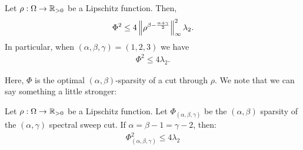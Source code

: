 \begin{theorem}
\label{thm:cheeger_n}
Let $\rho:{\Omega}\to\mathbb{R}_{>0}$ be a Lipschitz function. Then,
\begin{align*}
\Phi^2 \leq 4 \left\lVert \rho^{\beta - \frac{\alpha+\gamma}{2}} \right\rVert^2_\infty \lambda_2.
\end{align*}
In particular, when $(\alpha,\beta,\gamma) = (1,2,3)$ we have
\begin{align*}
\Phi^{2} \leq 4\lambda_2.
\end{align*}
\end{theorem}
Here, $\Phi$ is the optimal $(\alpha,\beta)$-sparsity of a cut
through $\rho$. We note that we can say something a little stronger:
\begin{theorem}
\label{thm:cheeger-sweep}
Let $\rho:{\Omega}\to\mathbb{R}_{>0}$ be a Lipschitz function. 
Let $\Phi_{(\alpha,\beta,\gamma)}$ be the $(\alpha,\beta)$
sparsity of the $(\alpha, \gamma)$ spectral sweep cut. If $\alpha = \beta-1 = \gamma-2$,  then:
\begin{align*}
\Phi_{(\alpha, \beta, \gamma)}^2 \leq 4 \lambda_2
\end{align*}
\end{theorem}
